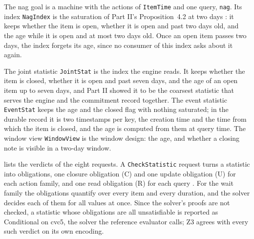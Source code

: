 \documentclass[11pt]{article}
\newcommand{\code}[1]{\texttt{#1}}
\theoremstyle{definition}
\theoremstyle{plain}
\begin{document}
The nag goal is a machine with the actions of \code{ItemTime} and one query, \code{nag}. Its index
\code{NagIndex} is the saturation of Part II's Proposition~4.2 at two days \cite{part2}: it keeps
whether the item is open, whether it is open and past two days old, and the age while it is open
and at most two days old. Once an open item passes two days, the index forgets its age, since no
consumer of this index asks about it again.

The joint statistic \code{JointStat} is the index the engine reads. It keeps whether the item is
closed, whether it is open and past seven days, and the age of an open item up to seven days, and
Part II showed it to be the coarsest statistic that serves the engine and the commitment record
together. The event statistic \code{EventStat} keeps the age and the closed flag with nothing
saturated; in the durable record it is two timestamps per key, the creation time and the time from
which the item is closed, and the age is computed from them at query time. The window view
\code{WindowView} is the window design: the age, and whether a closing note is visible in a two-day
window.

 lists the verdicts of the eight requests. A \code{CheckStatistic} request turns a
statistic into obligations, one closure obligation (C) and one update obligation (U) for each action
family, and one read obligation (R) for each query \cite[Section~3.4]{part2}. For the wait family
the obligations quantify over every item and every duration, and the solver decides each of them
for all values at once. Since the solver's proofs are not checked, a statistic whose obligations are
all unsatisfiable is reported as Conditional on cvc5, the solver the reference evaluator calls; Z3
agrees with every such verdict on its own encoding.
\end{document}
